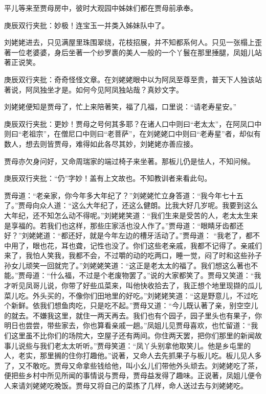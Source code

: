\begin{parag}
    平儿等来至贾母房中，彼时大观园中姊妹们都在贾母前承奉。\begin{note}庚辰双行夹批：妙极！连宝玉一并类入姊妹队中了。\end{note}刘姥姥进去，只见满屋里珠围翠绕，花枝招展，并不知都系何人。只见一张榻上歪著一位老婆婆，身后坐著一个纱罗裹的美人一般的一个丫鬟在那里捶腿，凤姐儿站著正说笑。\begin{note}庚辰双行夹批：奇奇怪怪文章。在刘姥姥眼中以为阿凤至尊至贵，普天下人独该站著说，阿凤独坐才是。如何今见阿凤独站哉？真妙文字。\end{note}刘姥姥便知是贾母了，忙上来陪著笑，福了几福，口里说：“请老寿星安。”\begin{note}庚辰双行夹批：更妙！贾母之号何其多耶？在诸人口中则曰“老太太”，在阿凤口中则曰“老祖宗”，在僧尼口中则曰“老菩萨”，在刘姥姥口中则曰“老寿星”者，却似有数人，想去则皆贾母，难得如此各尽其妙，刘姥姥亦善应接。\end{note}贾母亦欠身问好，又命周瑞家的端过椅子来坐著。那板儿仍是怯人，不知问候。\begin{note}庚辰双行夹批：“仍”字妙！盖有上文故也。不知教训者来看此句。\end{note}贾母道：“老亲家，你今年多大年纪了？”刘姥姥忙立身答道：“我今年七十五了。”贾母向众人道：“这么大年纪了，还这么健朗。比我大好几岁呢。我要到这么大年纪，还不知怎么动不得呢。”刘姥姥笑道：“我们生来是受苦的人，老太太生来是享福的。若我们也这样，那些庄家活也没人作了。”贾母道：“眼睛牙齿都还好？”刘姥姥道：“都还好，就是今年左边的槽牙活动了。”贾母道： “我老了，都不中用了，眼也花，耳也聋，记性也没了。你们这些老亲戚，我都不记得了。亲戚们来了，我怕人笑我，我都不会，不过嚼的动的吃两口，睡一觉，闷了时和这些孙子孙女儿顽笑一回就完了。”刘姥姥笑道：“这正是老太太的福了。我们想这么著也不能。”贾母道：“什么福，不过是个老废物罢了。”说的大家都笑了。贾母又笑道：“我才听见凤哥儿说，你带了好些瓜菜来，叫他快收拾去了，我正想个地里现撷的瓜儿菜儿吃。外头买的，不像你们田地里的好吃。”刘姥姥笑道：“这是野意儿，不过吃个新鲜。依我们想鱼肉吃，只是吃不起。”贾母又道：“今儿既认著了亲，别空空儿的就去。不嫌我这里，就住一两天再去。我们也有个园子，园子里头也有果子，你明日也尝尝，带些家去，你也算看亲戚一趟。”凤姐儿见贾母喜欢，也忙留道：“我们这里虽不比你们的场院大，空屋子还有两间。你住两天罢，把你们那里的新闻故事儿说些与我们老太太听听。”贾母笑道：“凤丫头别拿他取笑儿。他是乡屯里的人，老实，那里搁的住你打趣他。”说著，又命人去先抓果子与板儿吃。板儿见人多了，又不敢吃。贾母又命拿些钱给他，叫小幺儿们带他外头顽去。刘姥姥吃了茶，便把些乡村中所见所闻的事情说与贾母，贾母益发得了趣味。正说著，凤姐儿便令人来请刘姥姥吃晚饭。贾母又将自己的菜拣了几样，命人送过去与刘姥姥吃。
\end{parag}


